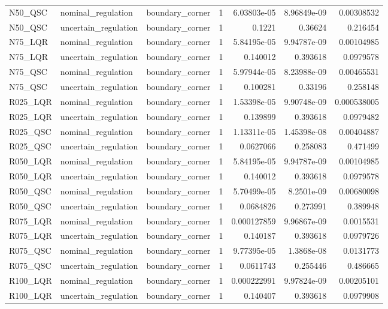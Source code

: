 \begin{tabular}{llllrrr}
N50\_QSC & nominal\_regulation & boundary\_corner & 1 & 6.03803e-05 & 8.96849e-09 & 0.00308532 \\
N50\_QSC & uncertain\_regulation & boundary\_corner & 1 & 0.1221 & 0.36624 & 0.216454 \\
N75\_LQR & nominal\_regulation & boundary\_corner & 1 & 5.84195e-05 & 9.94787e-09 & 0.00104985 \\
N75\_LQR & uncertain\_regulation & boundary\_corner & 1 & 0.140012 & 0.393618 & 0.0979578 \\
N75\_QSC & nominal\_regulation & boundary\_corner & 1 & 5.97944e-05 & 8.23988e-09 & 0.00465531 \\
N75\_QSC & uncertain\_regulation & boundary\_corner & 1 & 0.100281 & 0.33196 & 0.258148 \\
R025\_LQR & nominal\_regulation & boundary\_corner & 1 & 1.53398e-05 & 9.90748e-09 & 0.000538005 \\
R025\_LQR & uncertain\_regulation & boundary\_corner & 1 & 0.139899 & 0.393618 & 0.0979482 \\
R025\_QSC & nominal\_regulation & boundary\_corner & 1 & 1.13311e-05 & 1.45398e-08 & 0.00404887 \\
R025\_QSC & uncertain\_regulation & boundary\_corner & 1 & 0.0627066 & 0.258083 & 0.471499 \\
R050\_LQR & nominal\_regulation & boundary\_corner & 1 & 5.84195e-05 & 9.94787e-09 & 0.00104985 \\
R050\_LQR & uncertain\_regulation & boundary\_corner & 1 & 0.140012 & 0.393618 & 0.0979578 \\
R050\_QSC & nominal\_regulation & boundary\_corner & 1 & 5.70499e-05 & 8.2501e-09 & 0.00680098 \\
R050\_QSC & uncertain\_regulation & boundary\_corner & 1 & 0.0684826 & 0.273991 & 0.389948 \\
R075\_LQR & nominal\_regulation & boundary\_corner & 1 & 0.000127859 & 9.96867e-09 & 0.0015531 \\
R075\_LQR & uncertain\_regulation & boundary\_corner & 1 & 0.140187 & 0.393618 & 0.0979726 \\
R075\_QSC & nominal\_regulation & boundary\_corner & 1 & 9.77395e-05 & 1.3868e-08 & 0.0131773 \\
R075\_QSC & uncertain\_regulation & boundary\_corner & 1 & 0.0611743 & 0.255446 & 0.486665 \\
R100\_LQR & nominal\_regulation & boundary\_corner & 1 & 0.000222991 & 9.97824e-09 & 0.00205101 \\
R100\_LQR & uncertain\_regulation & boundary\_corner & 1 & 0.140407 & 0.393618 & 0.0979908 \\

\end{tabular}
